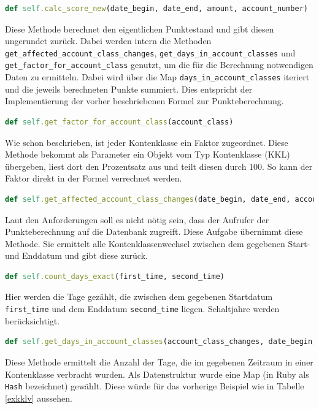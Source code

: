\documentclass[12pt]{scrreprt}
\begin{document}
\begin{lstlisting}[language=Ruby]
def self.calc_score_new(date_begin, date_end, amount, account_number)
\end{lstlisting}
Diese Methode berechnet den eigentlichen Punktestand und gibt diesen ungerundet zurück. Dabei werden intern die Methoden \verb+get_affected_account_class_changes+, \verb+get_days_in_account_classes+ und \verb+get_factor_for_account_class+ genutzt, um die für die Berechnung  notwendigen Daten zu ermitteln. Dabei wird über die Map \newline\verb+days_in_account_classes+ iteriert und die jeweils berechneten Punkte summiert. Dies entspricht der Implementierung der vorher beschriebenen Formel zur Punkteberechnung. \\

\begin{lstlisting}[language=Ruby]
def self.get_factor_for_account_class(account_class) 
\end{lstlisting}
Wie schon beschrieben, ist jeder Kontenklasse ein Faktor zugeordnet. Diese Methode bekommt als Parameter ein Objekt vom Typ Kontenklasse (KKL) übergeben, liest dort den Prozentsatz aus und teilt diesen durch 100. So kann der Faktor direkt in der Formel verrechnet werden. \\

\begin{lstlisting}[language=Ruby]
def self.get_affected_account_class_changes(date_begin, date_end, account_number)
\end{lstlisting}
Laut den Anforderungen soll es nicht nötig sein, dass der Aufrufer der Punkteberechnung auf die Datenbank zugreift. Diese Aufgabe übernimmt diese Methode. Sie ermittelt alle Kontenklassenwechsel zwischen dem gegebenen Start- und Enddatum und gibt diese zurück. \\

\begin{lstlisting}[language=Ruby]
def self.count_days_exact(first_time, second_time)
\end{lstlisting}
Hier werden die Tage gezählt, die zwischen dem gegebenen Startdatum \verb+first_time+ und dem Enddatum \verb+second_time+ liegen. Schaltjahre werden berücksichtigt.\\

\begin{lstlisting}[language=Ruby]
def self.get_days_in_account_classes(account_class_changes, date_begin, date_end)
\end{lstlisting}
Diese Methode ermittelt die Anzahl der Tage, die im gegebenen Zeitraum in einer Kontenklasse verbracht wurden. Als Datenstruktur wurde eine Map (in Ruby als \verb+Hash+ bezeichnet) gewählt. Diese würde für das vorherige Beispiel wie in Tabelle \ref{exkklv} aussehen. \\
\end{document}
